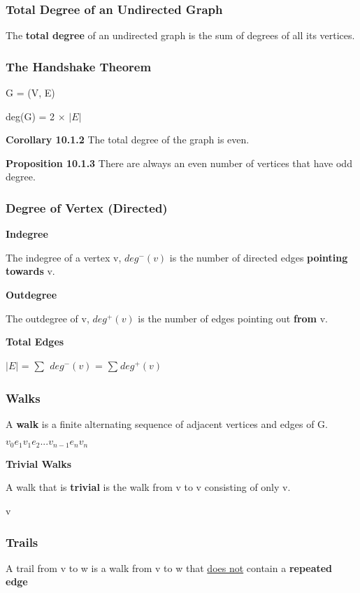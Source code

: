 \documentclass{article}
\newcommand{\sub}[1]{\vspace{10pt}\textbf{#1}}
\begin{document}
\subsubsection{Total Degree of an Undirected Graph}
The \textbf{total degree} of an undirected graph is the sum of degrees of all its vertices.

\subsubsection{The Handshake Theorem}
G = (V, E)

deg(G) = 2 $\times$ $|E|$

\sub{Corollary 10.1.2}
The total degree of the graph is even.

\sub{Proposition 10.1.3}
There are always an even number of vertices that have odd degree.

\subsubsection{Degree of Vertex (Directed)}
\sub{Indegree}

The indegree of a vertex v, $deg^-(v)$ is the number of directed edges \textbf{pointing towards} v.

\sub{Outdegree}

The outdegree of v, $deg^+(v)$ is the number of edges pointing out \textbf{from} v.

\sub{Total Edges}

$|E|$ = $\sum_{}^{}$ $deg^{-}(v)$ = $\sum_{}^{} deg^+(v)$

\subsubsection{Walks}
A \textbf{walk} is a finite alternating sequence of adjacent vertices and edges of G.
\begin{center}
    $v_0 e_1 v_1 e_2 ... v_{n-1} e_n v_n$
\end{center}

\sub{Trivial Walks}

A walk that is \textbf{trivial} is the walk from v to v consisting of only v.
\begin{center}
    v
\end{center}

\subsubsection{Trails}
A trail from v to w is a walk from v to w that \underline{does not} contain a \textbf{repeated edge}
\end{document}
